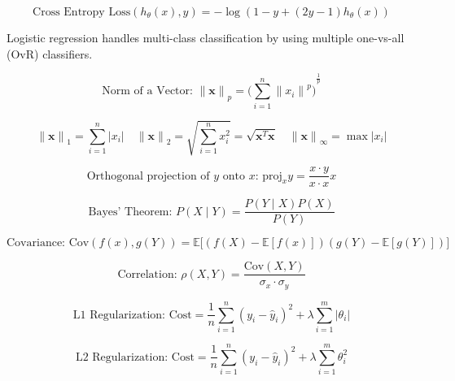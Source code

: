 \documentclass{article}
\begin{document}
\[\text{Cross Entropy Loss}(h_\theta(x),y)=-\log(1-y+(2y-1)h_\theta(x))\]

Logistic regression handles multi-class classification by using multiple one-vs-all (OvR) classifiers.

\[\text{Norm of a Vector: }{\|\mathbf{x}\|}_p={\Bigg(\sum_{i=1}^n{\|x_i\|}^p\Bigg)}^\frac{1}{p}\]

\[{\|\mathbf{x}\|}_1 = \sum_{i=1}^n |x_i|\quad{\|\mathbf{x}\|}_2=\sqrt{\sum_{i=1}^n x_i^2} = \sqrt{\mathbf{x}^T\mathbf{x}}\quad{\|\mathbf{x}\|}_\infty=\max |x_i |\]

\[\text{Orthogonal projection of $y$ onto $x$: }\text{proj}_x y=\frac{x\cdot y}{x\cdot x}x\]

\[\text{Bayes' Theorem: }P(X\mid Y)=\frac{P(Y\mid X)P(X)}{P(Y)}\]

\[\text{Covariance: }\text{Cov}(f(x), g(Y))=\mathbb{E}\Big[(f(X)-\mathbb{E}[f(x)])(g(Y)-\mathbb{E}[g(Y)])\Big]\]

\[\text{Correlation: }\rho(X, Y)=\frac{\text{Cov}(X, Y)}{\sigma_x\cdot\sigma_y}\]

\[\text{L1 Regularization: }\text{Cost}=\frac{1}{n}\sum_{i=1}^n{(y_i-\hat{y}_i)}^2+\lambda\sum_{i=1}^m|\theta_i|\]

\[\text{L2 Regularization: }\text{Cost}=\frac{1}{n}\sum_{i=1}^n{(y_i-\hat{y}_i)}^2+\lambda\sum_{i=1}^m{\theta^2_i}\]
\end{document}
